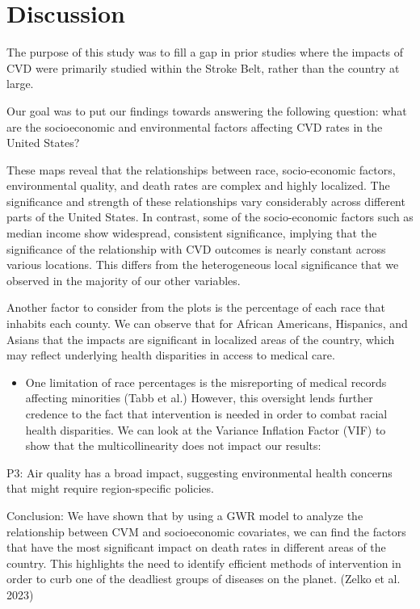 \documentclass[
]{article}
\providecommand{\tightlist}{%
  \setlength{\itemsep}{0pt}\setlength{\parskip}{0pt}}\usepackage{longtable,booktabs,array}
\begin{document}
\section{Discussion}\label{discussion}

The purpose of this study was to fill a gap in prior studies where the
impacts of CVD were primarily studied within the Stroke Belt, rather
than the country at large.

Our goal was to put our findings towards answering the following
question: what are the socioeconomic and environmental factors affecting
CVD rates in the United States?

These maps reveal that the relationships between race, socio-economic
factors, environmental quality, and death rates are complex and highly
localized. The significance and strength of these relationships vary
considerably across different parts of the United States. In contrast,
some of the socio-economic factors such as median income show
widespread, consistent significance, implying that the significance of
the relationship with CVD outcomes is nearly constant across various
locations. This differs from the heterogeneous local significance that
we observed in the majority of our other variables.

Another factor to consider from the plots is the percentage of each race
that inhabits each county. We can observe that for African Americans,
Hispanics, and Asians that the impacts are significant in localized
areas of the country, which may reflect underlying health disparities in
access to medical care.

\begin{itemize}
\tightlist
\item
  One limitation of race percentages is the misreporting of medical
  records affecting minorities (Tabb et al.) However, this oversight
  lends further credence to the fact that intervention is needed in
  order to combat racial health disparities. We can look at the Variance
  Inflation Factor (VIF) to show that the multicollinearity does not
  impact our results:
\end{itemize}

P3: Air quality has a broad impact, suggesting environmental health
concerns that might require region-specific policies.~

Conclusion: We have shown that by using a GWR model to analyze the
relationship between CVM and socioeconomic covariates, we can find the
factors that have the most significant impact on death rates in
different areas of the country. This highlights the need to identify
efficient methods of intervention in order to curb one of the deadliest
groups of diseases on the planet. (Zelko et al. 2023)
\end{document}
